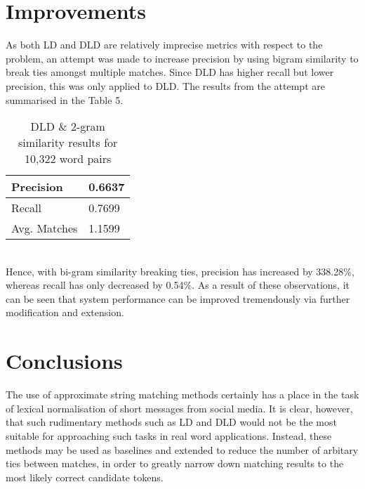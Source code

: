 \documentclass[11pt]{article}
\begin{document}
\section{Improvements}
As both LD and DLD are relatively imprecise metrics with respect to the problem, an attempt was made to increase precision by using bigram similarity to break ties amongst multiple matches. Since DLD has higher recall but lower precision, this was only applied to DLD. The results from the attempt are summarised in the Table 5.
\\
\begin{table}[h]
\begin{center}
\begin{tabular}{|l|l|}
      \hline
      Precision & 0.6637\\
      \hline
      Recall & 0.7699\\
      \hline
      Avg. Matches & 1.1599\\
      \hline
\end{tabular}
\caption{DLD \& 2-gram similarity results for 10,322 word pairs}\label{table2}
\end{center}
\end{table}
\\
Hence, with bi-gram similarity breaking ties, precision has increased by 338.28\%, whereas recall has only decreased by 0.54\%. As a result of these observations, it can be seen that system performance can be improved tremendously via further modification and extension.

\section{Conclusions}
The use of approximate string matching methods certainly has a place in the task of lexical normalisation of short messages from social media. It is clear, however, that such rudimentary methods such as LD and DLD would not be the most suitable for approaching such tasks in real word applications. Instead, these methods may be used as baselines and extended to reduce the number of arbitary ties between matches, in order to greatly narrow down matching results to the most likely correct candidate tokens. 
\end{document}
